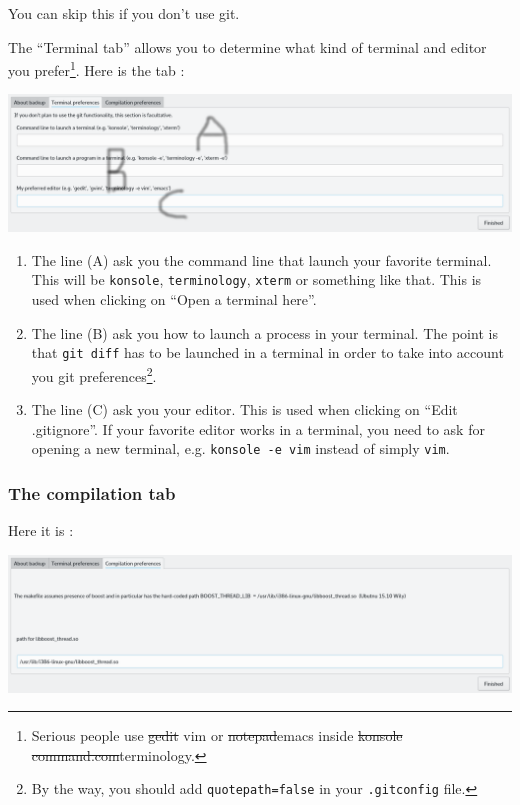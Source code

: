 \documentclass[a4paper,12pt]{article}
\newcommand{\info}[1]{\texttt{#1}}
\begin{document}
You can skip this if you don't use git. 

The ``Terminal tab'' allows you to determine what kind of terminal and editor you prefer\footnote{Serious people use \sout{gedit} vim or \sout{notepad}emacs inside \sout{konsole}\,\sout{command.com}terminology.}.
Here is the tab :

\begin{center}
    \includegraphics[width=\linewidth]{terminal_tab.png}
\end{center}
\begin{enumerate}
    \item
        The line (A) ask you the command line that launch your favorite terminal. This will be \info{konsole}, \info{terminology}, \info{xterm} or something like that. This is used when clicking on ``Open a terminal here''.
    \item
        The line (B) ask you how to launch a process in your terminal. The point is that \info{git diff} has to be launched in a terminal in order to take into account you git preferences\footnote{By the way, you should add \info{quotepath=false} in your \info{.gitconfig} file.}.
    \item
        The line (C) ask you your editor. This is used when clicking on ``Edit .gitignore''. If your favorite editor works in a terminal, you need to ask for opening a new terminal, e.g. \info{konsole -e vim} instead of simply \info{vim}.
\end{enumerate}

\subsubsection{The compilation tab}


Here it is :
\begin{center}
    \includegraphics[width=\linewidth]{compilation_tab.png}
\end{center}
\end{document}
